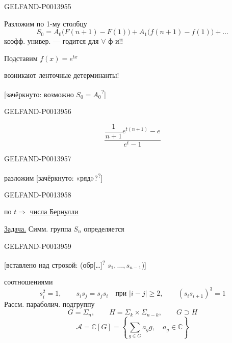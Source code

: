 \begin{GelfandAdjacentEvidence}{GELFAND-P001395}{5}


Разложим по 1-му столбцу
\[
S_0=A_0\bigl(F(n+1)-F(1)\bigr)
+A_1\bigl(f(n+1)-f(1)\bigr)+\ldots
\]
коэфф. универ. --- годится для \(\forall\) ф-и!!

Подставим \(f(x)=e^{tx}\)

возникают ленточные детерминанты!

[зачёркнуто:
возможно \(S_0=A_0\)\textsuperscript{?}]
\end{GelfandAdjacentEvidence}
\begin{GelfandAdjacentEvidence}{GELFAND-P001395}{6}

\[
\frac{\dfrac{1}{n+1}e^{t(n+1)}-e}{e^t-1}
\]
\end{GelfandAdjacentEvidence}
\begin{GelfandAdjacentEvidence}{GELFAND-P001395}{7}

разложим [зачёркнуто:
«ряд»?\textsuperscript{?}]
\end{GelfandAdjacentEvidence}
\begin{GelfandAdjacentEvidence}{GELFAND-P001395}{8}

по \(t\)\quad \(\Longrightarrow\) \uline{числа Бернулли}

\uline{Задача.} Симм. группа \(S_n\) определяется
\end{GelfandAdjacentEvidence}
\begin{GelfandAdjacentEvidence}{GELFAND-P001395}{9}

[вставлено над строкой: (обр[…]\textsuperscript{?} \(s_1,\ldots,s_{n-1}\))]
\end{GelfandAdjacentEvidence}

соотношениями
\[
s_i^2=1,\qquad s_i s_j=s_j s_i\quad\text{при }\lvert i-j\rvert\ge2,
\qquad (s_i s_{i+1})^3=1
\]
Рассм. параболич. подгруппу
\[
G=\Sigma_n,\qquad H=\Sigma_k\times\Sigma_{n-k},\qquad G\supset H
\]
\[
\mathcal A=\mathbb C[G]=
\left\{\sum_{g\in G}a_g g,\quad a_g\in\mathbb C\right\}
\]


